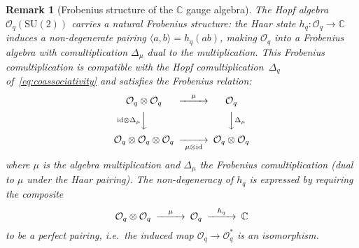 \documentclass[12pt,a4paper]{report}
\newtheorem{remark}[theorem]{Remark}
\begin{document}
\begin{remark}[Frobenius structure of the $\mathbb{C}$ gauge algebra]
\label{rem:frobenius-simplification}
The Hopf algebra $\mathcal{O}_q(\mathrm{SU}(2))$ carries a natural
\emph{Frobenius structure}: the Haar state
$h_q \colon \mathcal{O}_q \to \mathbb{C}$ induces a non-degenerate
pairing $\langle a, b \rangle = h_q(ab)$, making $\mathcal{O}_q$ into
a Frobenius algebra with comultiplication $\Delta_\mu$ dual to the
multiplication.  This Frobenius comultiplication is compatible with the
Hopf comultiplication~$\Delta_q$ of~\eqref{eq:coassociativity} and
satisfies the \emph{Frobenius relation}:
\begin{equation}\label{eq:frobenius-relation}
\begin{CD}
\mathcal{O}_q \otimes \mathcal{O}_q
  @>{\mu}>>
  \mathcal{O}_q \\
@V{\mathrm{id} \otimes \Delta_\mu}VV
  @VV{\Delta_\mu}V \\
\mathcal{O}_q \otimes \mathcal{O}_q \otimes \mathcal{O}_q
  @>>{\mu \otimes \mathrm{id}}>
  \mathcal{O}_q \otimes \mathcal{O}_q
\end{CD}
\end{equation}
where $\mu$ is the algebra multiplication and $\Delta_\mu$ the
Frobenius comultiplication (dual to $\mu$ under the Haar pairing).
The non-degeneracy of $h_q$ is expressed by requiring the composite
\begin{equation}\label{eq:frobenius-nondegen}
\begin{CD}
\mathcal{O}_q \otimes \mathcal{O}_q
  @>{\mu}>>
  \mathcal{O}_q
  @>{h_q}>>
  \mathbb{C}
\end{CD}
\end{equation}
to be a perfect pairing, i.e.\ the induced map
$\mathcal{O}_q \to \mathcal{O}_q^*$ is an isomorphism.


\end{remark}
\end{document}

